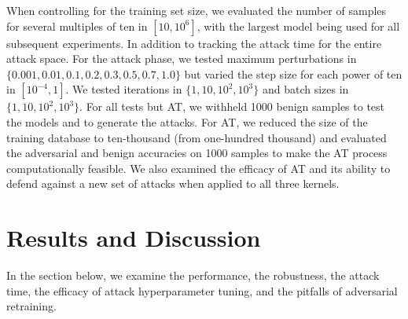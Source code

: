 \documentclass[fonts]{icst}
\begin{document}
When controlling for the training set size, we evaluated the number of samples for several multiples of ten in $[10, 10^6]$, with the largest model being used for all subsequent experiments.  In addition to tracking the attack time for the entire attack space. For the attack phase, we tested maximum perturbations in $\{0.001, 0.01, 0.1, 0.2, 0.3, 0.5, 0.7, 1.0\}$  but varied the step size for each power of ten in $[10^{-4}, 1]$. We tested iterations in $\{1, 10, 10^2, 10^3\}$ and batch sizes in $\{1, 10, 10^2, 10^3\}$. For all tests but AT, we withheld 1000 benign samples to test the models and to generate the attacks. For AT, we reduced the size of the training database to ten-thousand (from one-hundred thousand) and evaluated the adversarial and benign accuracies on 1000 samples to make the AT process computationally feasible.  We also examined the efficacy of AT and its ability to defend against a new set of attacks when applied to all three kernels. 



\section{Results and Discussion}
\label{results}
In the section below, we examine the performance, the robustness, the attack time, the efficacy of attack hyperparameter tuning, and the pitfalls of adversarial retraining.
\end{document}
